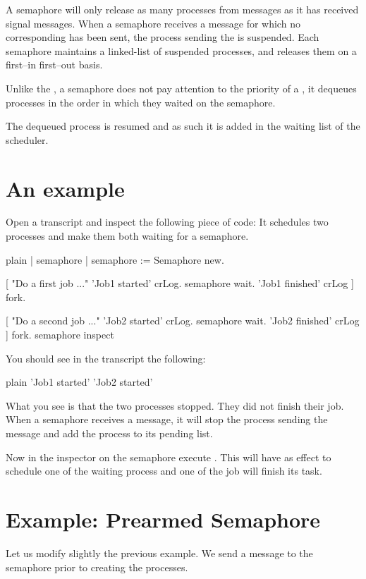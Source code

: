 \documentclass[10pt,twoside,english]{_support/latex/sbabook/sbabook}
\begin{document}
A semaphore will only release as many processes from  messages as it has received signal messages.
When a semaphore receives a  message for which no corresponding  has been sent, the process sending the  is suspended.
Each semaphore maintains a linked-list of suspended processes, and releases them on a first–in first–out basis.

Unlike the , a semaphore does not pay attention to the priority of a
, it dequeues processes in the order in which they waited on the semaphore.

The dequeued process is resumed and as such it is added in the waiting list of the scheduler.
\section{An example}
Open a transcript and inspect the following piece of code: It schedules two processes and make them both waiting for a semaphore. 

\begin{displaycode}{plain}
| semaphore |
semaphore := Semaphore new.

[ "Do a first job ..."
	'Job1 started' crLog.
	semaphore wait. 
	'Job1 finished' crLog
	] fork.

[ "Do a second job ..."
	'Job2 started' crLog.
	semaphore wait. 
	'Job2 finished' crLog
	] fork.
semaphore inspect
\end{displaycode}

You should see in the transcript the following:

\begin{displaycode}{plain}
'Job1 started'
'Job2 started'
\end{displaycode}

What you see is that the two processes stopped. They did not finish their job. 
When a semaphore receives a  message, it will stop the process sending the message and add the process to its pending list. 

Now in the inspector on the semaphore execute .
This will have as effect to schedule one of the waiting process and one of the job will finish its task.
\section{Example: Prearmed Semaphore}
Let us modify slightly the previous example. 
We send a  message to the semaphore prior to creating the processes.
\end{document}
